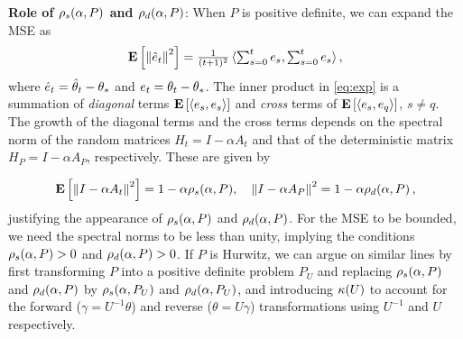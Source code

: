 \textbf{Role of $\rho_s(\alpha,P)$ and $\rho_d(\alpha,P)$}: 
When $P$ is positive definite, we can expand the MSE as 
\begin{align}
\label{eq:exp}
	\mathbf{E}\left[\left\| \hat{e}_t\right\|^2\right]=\tfrac{1}{(t+1)^2}\, \langle \textstyle\sum_{s=0}^t e_s,\textstyle\sum_{s=0}^t e_s\rangle\,,
\end{align} 
where $\hat{e}_t = \hat{\theta}_t-\theta_*$ and $e_t = \theta_t-\theta_*$.
The inner product in \eqref{eq:exp} is a summation of \emph{diagonal} terms $\mathbf{E}\left[\langle e_s,e_s\rangle\right]$ and \emph{cross} terms of $\mathbf{E}\left[\langle e_s,e_q\rangle\right]$, $s\neq q$. The growth of the diagonal terms and the cross terms depends on the spectral norm of the random matrices $H_t=I-\alpha A_t$ and that of the deterministic matrix $H_P=I-\alpha A_P$, respectively. These are given by
\begin{comment}
The output $\thh_t$ of the algorithm \eqref{eq:lsa} is the average of the internal states at times $s=0,\ldots,t-1$. The error dynamics of the internal states by looking at the behavior of $e_t\eqdef \theta_t-\ts$.
\begin{align}\label{eq:errec}
\theta_t&=\theta_{t-1}+\alpha(b_t-A_t\theta_{t-1})\nn\\
\theta_t-\ts&=\theta_{t-1}-\ts+\alpha\left(b_t-A_t(\theta_{t-1}-\ts+\ts)\right)\nn\\
e_t&=e_{t-1}+\alpha(b_t-A_t e_t -A_t\ts)\nn\\
e_t&=\underbrace{((I-\alpha A_t))}_{\text{Random-Matrix}} e_{t-1}+\underbrace{\alpha(N_t -(M_t)\ts)}_{\text{Noise}}
\end{align}
From \eqref{errec} it is clear that the error dynamics depends on the $i)$ properties of the random matrix, $ii)$ properties of the noise. In the absence of the noise term in \eqref{eq:errec}, we have $e_t=(I-\alpha A_t) e_{t-1}=\Pi_{s=1}(I-\alpha A_s) e_0$, i.e., the initial error is get multiplied by a product of random matrices. In such a scenario, we can guess that whether or not the algorithm forgets the bias $\norm{\theta_0-\ts}$, depends on whether the matrix product is contracting. One way to characterize this contracting property is to look at the spectral radius of the random matrix, which is given by
\end{comment}
\begin{align}\label{eq:spectralrand}
\mathbf{E}\left[\left\| I-\alpha A_t\right\|^2\right]=1-\alpha \rho_s(\alpha,P), \quad  {\left\| I-\alpha A_P\right\|^2}=1-\alpha \rho_d(\alpha,P)\,,
\end{align}
justifying the appearance of $\rho_s(\alpha,P)$ and $\rho_d(\alpha,P)$.
For the MSE to be bounded, we need the spectral norms to be less than unity, implying the conditions $\rho_s(\alpha,P)>0$ and $\rho_d(\alpha,P)>0$. If $P$ is Hurwitz, we can argue on similar lines by first transforming $P$ into a positive definite problem $P_U$ and replacing $\rho_s(\alpha,P)$ and $\rho_d(\alpha,P)$ by $\rho_s(\alpha,P_U)$ and $\rho_d(\alpha,P_U)$, and introducing $\kappa(U)$ to account for the forward ($\gamma=U^{-1}\theta$) and reverse ($\theta=U\gamma$) transformations using $U^{-1}$ and $U$ respectively.

